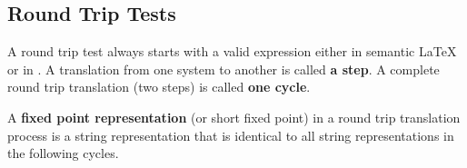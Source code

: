 \subsection{Round Trip Tests}\label{sec:round-trip}


A round trip test always starts with a valid expression either in semantic \LaTeX{} or in \Maple. A translation from one system to another is called \textbf{a step}. A complete round trip translation (two steps) is called \textbf{one cycle}.

\begin{definition}
A \textbf{fixed point representation} (or short fixed point) in a round trip translation process is a string representation that is identical to all string representations in the following cycles.
\end{definition}



